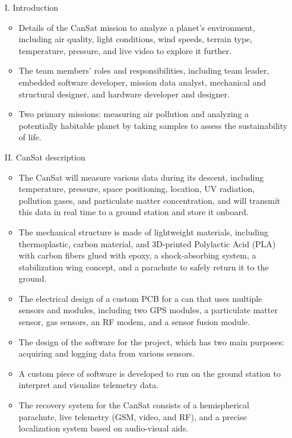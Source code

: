 \documentclass[11pt]{article}
\begin{document}
\begin{itemize}[leftmargin=1cm, itemindent=0.25cm, noitemsep, topsep=0pt, label=$\bullet$]
\item[I.] Introduction
\begin{itemize}[label=$\bullet$, noitemsep, topsep=2pt]
\item Details of the CanSat mission to analyze a planet's environment, including air quality, light conditions, wind speeds, terrain type, temperature, pressure, and live video to explore it further.
\item The team members' roles and responsibilities, including team leader, embedded software developer, mission data analyst, mechanical and structural designer, and hardware developer and designer.
\item Two primary missions: measuring air pollution and analyzing a potentially habitable planet by taking samples to assess the sustainability of life.
\end{itemize}
\item[II.] CanSat description
\begin{itemize}[label=$\bullet$, noitemsep, topsep=2pt]
\item The CanSat will measure various data during its descent, including temperature, pressure, space positioning, location, UV radiation, pollution gases, and particulate matter concentration, and will transmit this data in real time to a ground station and store it onboard.
\item The mechanical structure is made of lightweight materials, including thermoplastic, carbon material, and 3D-printed Polylactic Acid (PLA) with carbon fibers glued with epoxy, a shock-absorbing system, a stabilization wing concept, and a parachute to safely return it to the ground.
\item The electrical design of a custom PCB for a can that uses multiple sensors and modules, including two GPS modules, a particulate matter sensor, gas sensors, an RF modem, and a sensor fusion module.
\item The design of the software for the project, which has two main purposes: acquiring and logging data from various sensors.
\item A custom piece of software is developed to run on the ground station to interpret and visualize telemetry data.
\item The recovery system for the CanSat consists of a hemispherical parachute, live telemetry (GSM, video, and RF), and a precise localization system based on audio-visual aids.

\end{itemize}
\end{itemize}
\end{document}
